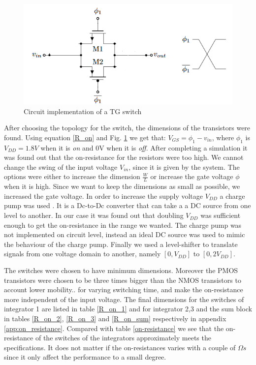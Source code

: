 \begin{figure}[h]
\centering
\includegraphics[scale=0.7]{images/TG_switch.png}
\caption{Circuit implementation of a TG switch}
\label{fig:TG_switch}
\end{figure}

After choosing the topology for the switch, the dimensions of the transistors were found. Using equation \ref{R_on} and Fig. \ref{fig:TG_switch} we get that: $V_{GS} = \phi_1 - v_{in}$, where $\phi_1$ is $V_{DD}=1.8V$ when it is \textit{on} and 0V when it is \textit{off}. After completing a simulation it was found out that the on-resistance for the resistors were too high. We cannot change the swing of the input voltage $V_{in}$, since it is given by the system. The options were either to increase the dimension $\frac{W}{L}$ or increase the gate voltage $\phi$ when it is high. Since we want to keep the dimensions as small as possible, we increased the gate voltage. In order to increase the supply voltage $V_{DD}$ a charge pump was used \cite{charge_pump}. It is a Dc-to-Dc converter that can take a a DC source from one level to another. In our case it was found out that doubling $V_{DD}$ was sufficient enough to get the on-resistance in the range we wanted. The charge pump was not implemented on circuit level, instead an ideal DC source was used to mimic the behaviour of the charge pump. Finally we used a level-shifter \cite{William} to translate signals from one voltage domain to another, namely $[0,V_{DD}]$ to $[0,2V_{DD}]$. 

The switches were chosen to have minimum dimensions. Moreover the PMOS transistors were chosen to be three times bigger than the NMOS transistors to account lower mobility.. for varying switching time, and make the on-resistance more independent of the input voltage. The final dimensions for the switches of integrator 1 are listed in table \ref{R_on_1} and for integrator 2,3 and the sum block in tables \ref{R_on_2}, \ref{R_on_3} and \ref{R_on_sum} respectively in appendix \ref{app:on_resistance}. Compared with table \ref{on-resistance} we see that the on-resistance of the switches of the integrators approximately meets the specifications. It does not matter if the on-resistances varies with a couple of $\Omega s$ since it only affect the performance to a small degree. 


